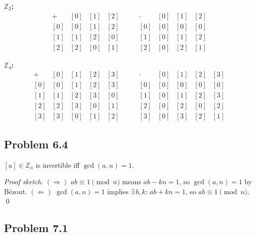 \textbf{$\mathbb{Z}_3$:}
\[
\begin{array}{c|ccc}
+ & [0] & [1] & [2] \\\hline
{[0]} & [0] & [1] & [2] \\
{[1]} & [1] & [2] & [0] \\
{[2]} & [2] & [0] & [1]
\end{array}
\qquad
\begin{array}{c|ccc}
\cdot & [0] & [1] & [2] \\\hline
{[0]} & [0] & [0] & [0] \\
{[1]} & [0] & [1] & [2] \\
{[2]} & [0] & [2] & [1]
\end{array}
\]

\textbf{$\mathbb{Z}_4$:}
\[
\begin{array}{c|cccc}
+ & [0] & [1] & [2] & [3] \\\hline
{[0]} & [0] & [1] & [2] & [3] \\
{[1]} & [1] & [2] & [3] & [0] \\
{[2]} & [2] & [3] & [0] & [1] \\
{[3]} & [3] & [0] & [1] & [2]
\end{array}
\qquad
\begin{array}{c|cccc}
\cdot & [0] & [1] & [2] & [3] \\\hline
{[0]} & [0] & [0] & [0] & [0] \\
{[1]} & [0] & [1] & [2] & [3] \\
{[2]} & [0] & [2] & [0] & [2] \\
{[3]} & [0] & [3] & [2] & [1]
\end{array}
\]


\subsection*{Problem 6.4}

$[a]\in\mathbb{Z}_n$ is invertible iff $\gcd(a,n)=1$.

\emph{Proof sketch.}
$(\Rightarrow)$ $ab\equiv 1\pmod{n}$ means $ab - kn = 1$, so $\gcd(a,n)=1$ by B\'ezout.
$(\Leftarrow)$ $\gcd(a,n)=1$ implies $\exists\,b,k$: $ab+kn=1$, so $ab\equiv 1\pmod{n}$. \qed


\subsection*{Problem 7.1}

